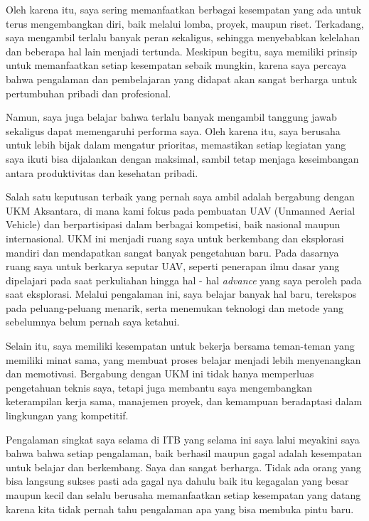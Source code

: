 \documentclass[
  letterpaper,
  DIV=11,
  numbers=noendperiod]{scrreprt}
\begin{document}
Oleh karena itu, saya sering memanfaatkan berbagai kesempatan yang ada
untuk terus mengembangkan diri, baik melalui lomba, proyek, maupun
riset. Terkadang, saya mengambil terlalu banyak peran sekaligus,
sehingga menyebabkan kelelahan dan beberapa hal lain menjadi tertunda.
Meskipun begitu, saya memiliki prinsip untuk memanfaatkan setiap
kesempatan sebaik mungkin, karena saya percaya bahwa pengalaman dan
pembelajaran yang didapat akan sangat berharga untuk pertumbuhan pribadi
dan profesional.

Namun, saya juga belajar bahwa terlalu banyak mengambil tanggung jawab
sekaligus dapat memengaruhi performa saya. Oleh karena itu, saya
berusaha untuk lebih bijak dalam mengatur prioritas, memastikan setiap
kegiatan yang saya ikuti bisa dijalankan dengan maksimal, sambil tetap
menjaga keseimbangan antara produktivitas dan kesehatan pribadi.

Salah satu keputusan terbaik yang pernah saya ambil adalah bergabung
dengan UKM Aksantara, di mana kami fokus pada pembuatan UAV (Unmanned
Aerial Vehicle) dan berpartisipasi dalam berbagai kompetisi, baik
nasional maupun internasional. UKM ini menjadi ruang saya untuk
berkembang dan eksplorasi mandiri dan mendapatkan sangat banyak
pengetahuan baru. Pada dasarnya ruang saya untuk berkarya seputar UAV,
seperti penerapan ilmu dasar yang dipelajari pada saat perkuliahan
hingga hal - hal \emph{advance} yang saya peroleh pada saat eksplorasi.
Melalui pengalaman ini, saya belajar banyak hal baru, terekspos pada
peluang-peluang menarik, serta menemukan teknologi dan metode yang
sebelumnya belum pernah saya ketahui.

Selain itu, saya memiliki kesempatan untuk bekerja bersama teman-teman
yang memiliki minat sama, yang membuat proses belajar menjadi lebih
menyenangkan dan memotivasi. Bergabung dengan UKM ini tidak hanya
memperluas pengetahuan teknis saya, tetapi juga membantu saya
mengembangkan keterampilan kerja sama, manajemen proyek, dan kemampuan
beradaptasi dalam lingkungan yang kompetitif.

Pengalaman singkat saya selama di ITB yang selama ini saya lalui
meyakini saya bahwa bahwa setiap pengalaman, baik berhasil maupun gagal
adalah kesempatan untuk belajar dan berkembang. Saya dan sangat
berharga. Tidak ada orang yang bisa langsung sukses pasti ada gagal nya
dahulu baik itu kegagalan yang besar maupun kecil dan selalu berusaha
memanfaatkan setiap kesempatan yang datang karena kita tidak pernah tahu
pengalaman apa yang bisa membuka pintu baru.
\end{document}

